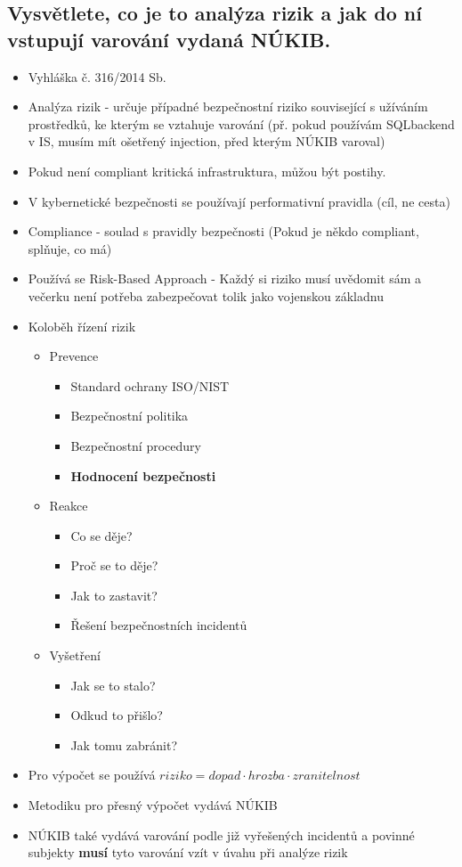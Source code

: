 \subsection{Vysvětlete, co je to analýza rizik a jak do ní vstupují varování vydaná NÚKIB.}
\begin{itemize}
    \item Vyhláška č. 316/2014 Sb.
    \item Analýza rizik - určuje případné bezpečnostní riziko související s užíváním prostředků, ke kterým se vztahuje varování (př. pokud používám SQLbackend v IS, musím mít ošetřený injection, před kterým NÚKIB varoval)
    \item {} Pokud není compliant kritická infrastruktura, můžou být postihy.
    \item V kybernetické bezpečnosti se používají performativní pravidla (cíl, ne cesta)
    \item Compliance - soulad s pravidly bezpečnosti (Pokud je někdo compliant, splňuje, co má)
    \item Používá se Risk-Based Approach - Každý si riziko musí uvědomit sám a večerku není potřeba zabezpečovat tolik jako vojenskou základnu
    \item Koloběh řízení rizik
    \begin{itemize}
        \item Prevence
        \begin{itemize}
            \item Standard ochrany ISO/NIST
            \item Bezpečnostní politika
            \item Bezpečnostní procedury
            \item \textbf{Hodnocení bezpečnosti}
        \end{itemize}
        \item Reakce
        \begin{itemize}
            \item Co se děje?
            \item Proč se to děje?
            \item Jak to zastavit?
            \item Řešení bezpečnostních incidentů
        \end{itemize}
        \item Vyšetření
        \begin{itemize}
            \item Jak se to stalo?
            \item Odkud to přišlo?
            \item Jak tomu zabránit?
        \end{itemize}
    \end{itemize}
    \item Pro výpočet se používá $ riziko = dopad \cdot hrozba \cdot zranitelnost $
    \item Metodiku pro přesný výpočet vydává NÚKIB
    \item NÚKIB také vydává varování podle již vyřešených incidentů a povinné subjekty \textbf{musí} tyto varování vzít v úvahu při analýze rizik
\end{itemize}
